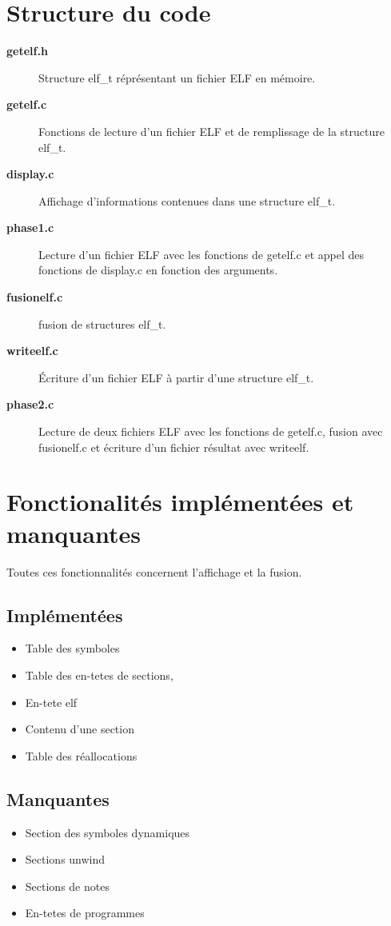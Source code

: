 \documentclass[10pt,twoside]{article}   %
\begin{document}
\section{Structure du code}
	\begin{description}
	\item [\bf{getelf.h}] Structure elf\_t réprésentant un fichier ELF en mémoire.
	\item [\bf{getelf.c}] Fonctions de lecture d'un fichier ELF et de remplissage de la structure elf\_t.
	\item [\bf{display.c}] Affichage d'informations contenues dans une structure elf\_t.
	\item [\bf{phase1.c}] Lecture d'un fichier ELF avec les fonctions de getelf.c et appel des fonctions de display.c en fonction des arguments.
	\item [\bf{fusionelf.c}] fusion de structures elf\_t.
	\item [\bf{writeelf.c}] Écriture d'un fichier ELF à partir d'une structure elf\_t.
	\item [\bf{phase2.c}] Lecture de deux fichiers ELF avec les fonctions de getelf.c, fusion avec fusionelf.c et écriture d'un fichier résultat avec writeelf.
	\end{description}


\section{Fonctionalités implémentées et manquantes}
	Toutes ces fonctionnalités concernent l'affichage et la fusion.
	\subsection{Implémentées}
		\begin{itemize}
			\item Table des symboles
			\item Table des en-tetes de sections,
			\item En-tete elf
			\item Contenu d'une section
			\item Table des réallocations
		\end{itemize}
	\subsection{Manquantes}
		\begin{itemize}
			\item Section des symboles dynamiques
			\item Sections unwind
			\item Sections de notes
			\item En-tetes de programmes
		\end{itemize}
\end{document}
